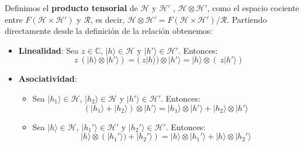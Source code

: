 \vspace{5pt}
Definimos el \textbf{producto tensorial} de $\mathscr{H}$ y $\mathscr{H}'$ , $\mathscr{H} \otimes \mathscr{H}'$, como el espacio cociente entre $F(\mathscr{H} \times \mathscr{H}')$ y $\mathscr{R}$, es decir, $\mathscr{H} \otimes \mathscr{H}' = F(\mathscr{H} \times \mathscr{H}')/\mathscr{R}$. Partiendo directamente desde la definición de la relación obtenemos:

\begin{itemize}
    \item \textbf{Linealidad}: Sea $z\in\mathbb{C}$, $|h\rangle\in\mathscr{H}$ y $|h'\rangle\in\mathscr{H}'$. Entonces:
        \begin{equation}
            z\:(|h\rangle \otimes |h'\rangle) = (\:z|h\rangle) \otimes |h'\rangle = |h\rangle \otimes (\:z|h'\rangle)
        \end{equation}
        
    \newpage
    \item \textbf{Asociatividad}:
    \begin{itemize}
        \item Sea $|h_{1}\rangle\in\mathscr{H}$, $|h_{2}\rangle\in\mathscr{H}$ y $|h'\rangle\in\mathscr{H}'$. Entonces:
            \begin{equation}
                (|h_{1}\rangle + |h_{2}\rangle)\otimes|h'\rangle = |h_{1}\rangle \otimes|h'\rangle + |h_{2}\rangle \otimes|h'\rangle
            \end{equation}

        \item Sea $|h\rangle\in\mathscr{H}$, $|h_{1}'\rangle\in\mathscr{H}'$ y $|h_{2}'\rangle\in\mathscr{H}'$. Entonces:
            \begin{equation}
                |h\rangle \otimes (|h_{1}'\rangle) + |h_{2}'\rangle) = |h\rangle \otimes|h_{1}'\rangle + |h\rangle \otimes|h_{2}'\rangle
            \end{equation}
    \end{itemize}
\end{itemize}

